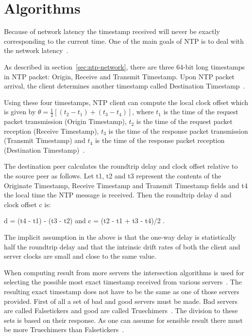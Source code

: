 
\section{Algorithms}
Because of network latency the timestamp received will never be exactly
corresponding to the current time.
One of the main goals of NTP is to deal with the network latency~\cite{ntp-overview}.

As described in section~\ref{sec:ntp-network},
there are three 64-bit long timestamps in NTP packet: Origin, Receive and Transmit Timestamp.
Upon NTP packet arrival, the client determines another timestamp called
Destination Timestamp~\cite{rfc5905}.

Using these four timestamps, NTP client can compute
the local clock offset which is given by $\theta = \frac{1}{2}[(t_2 - t_1) + (t_3 - t_4)]$,
where $t_1$ is the time of the request packet transmission (Origin Timestamp),
$t_2$ is the time of the request packet reception (Receive Timestamp),
$t_3$ is the time of the response packet transmission (Transmit Timestamp) and
$t_4$ is the time of the response packet reception (Destination Timestamp)~\cite{ntp-algor,rfc5905}.


The destination peer calculates the roundtrip delay and clock
      offset relative to the source peer as follows.  Let t1, t2 and t3
      represent the contents of the Originate Timestamp, Receive
      Timestamp and Transmit Timestamp fields and t4 the local time the
      NTP message is received.  Then the roundtrip delay d and clock
      offset c is:

         d = (t4 - t1) - (t3 - t2)  and  c = (t2 - t1 + t3 - t4)/2 .

      The implicit assumption in the above is that the one-way delay is
      statistically half the roundtrip delay and that the intrinsic
      drift rates of both the client and server clocks are small and
      close to the same value.

When computing result from more servers the intersection algorithms is used
for selecting the possible most exact timestamp received from various servers~\cite{rfc5905}.
The resulting exact timestamp does not have to be the same
as one of those servers provided.
First of all a set of bad and good servers must be made.
Bad servers are called Falsetickers and good are called Truechimers~\cite{rfc5905}.
The division to these sets is based on their response.
As one can assume for sensible result there must be more Truechimers than Falsetickers~\cite{rfc5905}.

